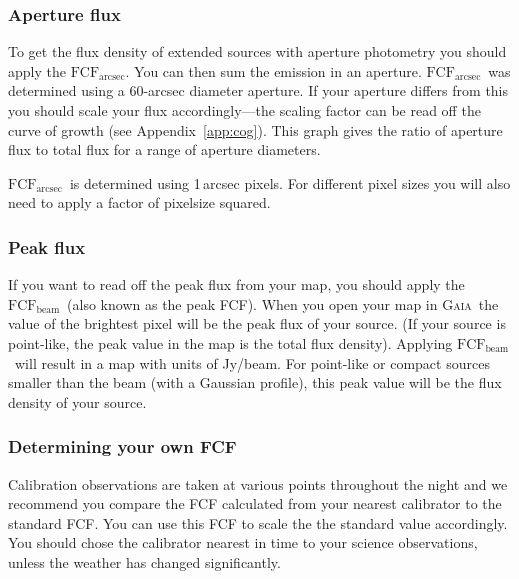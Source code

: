 \documentclass[twoside,11pt]{article}
\newcommand{\htmlref}[2]{#1}
\newcommand{\latexhtml}[2]{#1}
\newcommand{\xref}[3]{#1}
\renewcommand{\_}{\texttt{\symbol{95}}}
\newcommand{\fcfb}{$\mathrm{FCF_{beam}}$}
\newcommand{\fcfa}{$\mathrm{FCF_{arcsec}}$}
\newcommand{\gaia}{\xref{\textsc{Gaia}}{sun214}{}}
\newcommand{\cref}[3]{\latexhtml{#1~\ref{#2}}{\htmlref{#3}{#2}}}
\begin{document}
\subsubsection{Aperture flux}

To get the flux density of extended sources with aperture
photometry you should apply the \fcfa.  You can then sum the emission
in an aperture. \fcfa\ was determined using a 60-arcsec diameter
aperture. If your aperture differs from this you should scale your
flux accordingly---the scaling factor can be read off the curve of
growth (see \cref{Appendix}{app:cog}{this appendix}). This graph gives
the ratio of aperture flux to total flux for a range of aperture diameters.

\fcfa\ is determined using 1\,arcsec pixels. For different pixel sizes
you will also need to apply a factor of pixelsize squared.

\subsubsection{Peak flux}

If you want to read off the peak flux from your map, you should apply
the \fcfb\ (also known as the peak FCF).  When you open your map in
\gaia\ the value of the brightest pixel will be the peak flux of your
source. (If your source is point-like, the peak value in the map is
the total flux density). Applying \fcfb\ will result in a map with
units of Jy/beam. For point-like or compact sources smaller than the
beam (with a Gaussian profile), this peak value will be the flux
density of your source.

\subsubsection{Determining your own FCF}

Calibration observations are taken at various points throughout the
night and we recommend you compare the FCF calculated from your
nearest calibrator to the standard FCF. You can use this FCF to scale
the the standard value accordingly. You should chose the calibrator
nearest in time to your science observations, unless the weather has
changed significantly.
\end{document}
